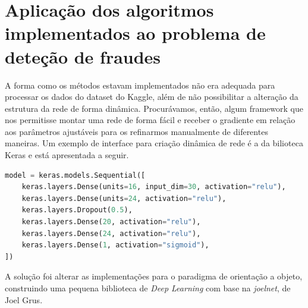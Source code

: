 \documentclass[11pt]{article}
\begin{document}
\newpage
\section{Aplicação dos algoritmos implementados ao problema de deteção de fraudes}

A forma como os métodos estavam implementados não era adequada para processar os dados do dataset do Kaggle, além de não possibilitar a alteração da estrutura da rede de forma dinâmica. Procurávamos, então, algum framework que nos permitisse montar uma rede de forma fácil e receber o gradiente em relação aos parâmetros ajustáveis para os refinarmos manualmente de diferentes maneiras. Um exemplo de interface para criação dinâmica de rede é a da bilioteca Keras\supercite{KERAS} e está apresentada a seguir.\\
\begin{lstlisting}[language=Python, caption=Interface do Keras]
model = keras.models.Sequential([
    keras.layers.Dense(units=16, input_dim=30, activation="relu"),
    keras.layers.Dense(units=24, activation="relu"),  
    keras.layers.Dropout(0.5),  
    keras.layers.Dense(20, activation="relu"),  
    keras.layers.Dense(24, activation="relu"),  
    keras.layers.Dense(1, activation="sigmoid"),  
])
\end{lstlisting}

A solução foi alterar as implementações para o paradigma de orientação a objeto, construindo uma pequena biblioteca de \textit{Deep Learning} com base na \textit{joelnet}\supercite{joelnet}, de Joel Grus.
\end{document}
